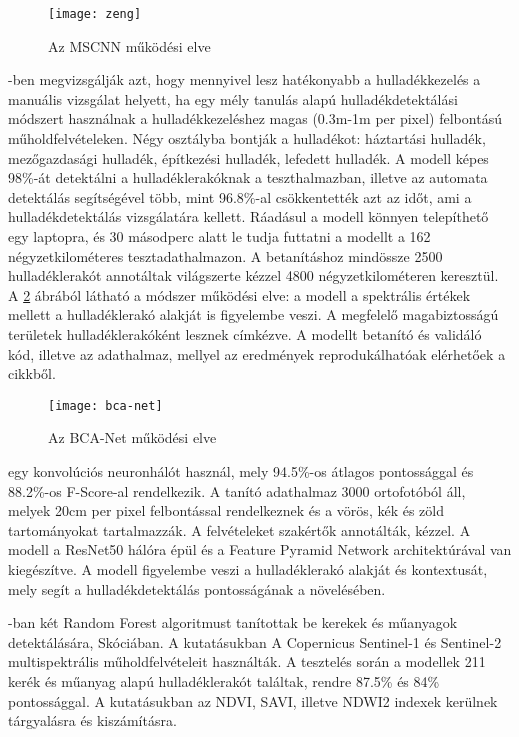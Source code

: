 \begin{figure}[H]
	\centering
	\texttt{[image: zeng]}
	\caption{Az MSCNN működési elve \cite{zeng2019}}
    \label{fig:zeng}
\end{figure}

\cite{sun2023}-ben megvizsgálják azt, hogy mennyivel lesz hatékonyabb a hulladékkezelés a manuális vizsgálat helyett, ha egy mély tanulás alapú hulladékdetektálási módszert használnak a hulladékkezeléshez magas (0.3m-1m per pixel) felbontású műholdfelvételeken. Négy osztályba bontják a hulladékot: háztartási hulladék, mezőgazdasági hulladék, építkezési hulladék, lefedett hulladék. A modell képes 98\%-át detektálni a hulladéklerakóknak a teszthalmazban, illetve az automata detektálás segítségével több, mint 96.8\%-al csökkentették azt az időt, ami a hulladékdetektálás vizsgálatára kellett. Ráadásul a modell könnyen telepíthető egy laptopra, és 30 másodperc alatt le tudja futtatni a modellt a 162 négyzetkilométeres tesztadathalmazon. A betanításhoz mindössze 2500 hulladéklerakót annotáltak világszerte kézzel 4800 négyzetkilométeren keresztül. A \ref{fig:bca-net-working} ábrából látható a módszer működési elve: a modell a spektrális értékek mellett a hulladéklerakó alakját is figyelembe veszi. A megfelelő magabiztosságú területek hulladéklerakóként lesznek címkézve. A modellt betanító és validáló kód, illetve az adathalmaz, mellyel az eredmények reprodukálhatóak elérhetőek a cikkből.

\begin{figure}[H]
	\centering
	\texttt{[image: bca-net]}
	\caption{Az BCA-Net működési elve \cite{sun2023}}
    \label{fig:bca-net-working}
\end{figure}

\cite{Torres2021} egy konvolúciós neuronhálót használ, mely 94.5\%-os átlagos pontossággal és 88.2\%-os F-Score-al rendelkezik. A tanító adathalmaz 3000 ortofotóból áll, melyek 20cm per pixel felbontással rendelkeznek és a vörös, kék és zöld tartományokat tartalmazzák. A felvételeket szakértők annotálták, kézzel. A modell a ResNet50 \cite{ResNet2016} hálóra épül és a Feature Pyramid Network \cite{FPN2017} architektúrával van kiegészítve. A modell figyelembe veszi a hulladéklerakó alakját és kontextusát, mely segít a hulladékdetektálás pontosságának a növelésében.

\cite{Page2020}-ban két Random Forest algoritmust tanítottak be kerekek és műanyagok detektálására, Skóciában. A kutatásukban A Copernicus Sentinel-1 és Sentinel-2 multispektrális műholdfelvételeit használták. A tesztelés során a modellek 211 kerék és műanyag alapú hulladéklerakót találtak, rendre 87.5\% és 84\% pontossággal. A kutatásukban az NDVI, SAVI, illetve NDWI2 indexek kerülnek tárgyalásra és kiszámításra.

